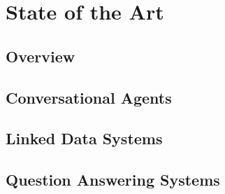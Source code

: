 \chapter{State of the Art}
\label{chap:state_of_the_art}

\begin{chapterintro}



\end{chapterintro}

\cleardoublepage

\section{Overview}

\section{Conversational Agents}
\label{sec:conv_agents}

\section{Linked Data Systems}
\label{sec:linkd_sys}

\section{Question Answering Systems}
\label{sec:qa_sys}
